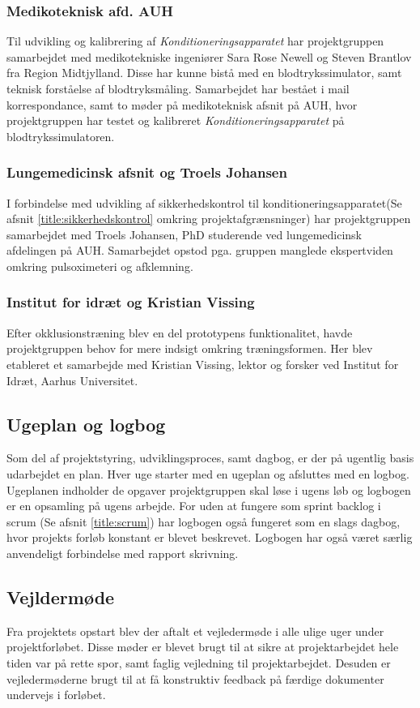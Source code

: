 \subsubsection{Medikoteknisk afd. AUH}
Til udvikling og kalibrering af \textit{Konditioneringsapparatet} har projektgruppen samarbejdet med medikotekniske ingeniører  Sara Rose Newell og Steven Brantlov fra Region Midtjylland. Disse har kunne bistå med en blodtrykssimulator, samt teknisk forståelse af blodtryksmåling. Samarbejdet har bestået i mail korrespondance, samt to møder på medikoteknisk afsnit på AUH, hvor projektgruppen har testet og kalibreret \textit{Konditioneringsapparatet} på blodtrykssimulatoren. 

\subsubsection{Lungemedicinsk afsnit og Troels Johansen}
I forbindelse med udvikling af sikkerhedskontrol til konditioneringsapparatet(Se afsnit \ref{title:sikkerhedskontrol} omkring projektafgrænsninger) har projektgruppen samarbejdet med Troels Johansen, PhD studerende ved lungemedicinsk afdelingen på AUH. Samarbejdet opstod pga. gruppen manglede ekspertviden omkring pulsoximeteri og afklemning.

\subsubsection{Institut for idræt og Kristian Vissing} 
Efter okklusionstræning blev en del prototypens funktionalitet, havde projektgruppen behov for mere indsigt omkring træningsformen. Her blev etableret et samarbejde med Kristian Vissing, lektor og forsker ved Institut for Idræt, Aarhus Universitet.  

\subsection{Ugeplan og logbog}
Som del af projektstyring, udviklingsproces, samt dagbog, er der på ugentlig basis udarbejdet en plan. Hver uge starter med en ugeplan og afsluttes med en logbog. Ugeplanen indholder de opgaver projektgruppen skal løse i ugens løb og logbogen er en opsamling på ugens arbejde. For uden at fungere som sprint backlog i scrum (Se afsnit \ref{title:scrum}) har logbogen også fungeret som en slags dagbog, hvor projekts forløb konstant er blevet beskrevet. Logbogen har også været særlig anvendeligt forbindelse med rapport skrivning. 

\subsection{Vejldermøde}
Fra projektets opstart blev der aftalt et vejledermøde i alle ulige uger under projektforløbet. Disse møder er blevet brugt til at sikre at projektarbejdet hele tiden var på rette spor, samt faglig vejledning til projektarbejdet. Desuden er vejledermøderne brugt til at få konstruktiv feedback på færdige dokumenter undervejs i forløbet. 

